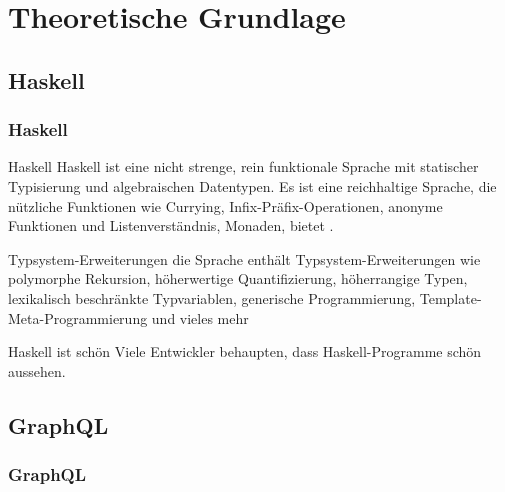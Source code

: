 
\section{Theoretische Grundlage}

\subsection{Haskell}
\begin{frame}{}
    \frametitle{Haskell}
\end{frame}

\begin{frame}{}

    \footnotesize

    \begin{block}{Haskell}
        Haskell ist eine nicht strenge, rein funktionale Sprache mit statischer Typisierung und algebraischen Datentypen. Es ist eine reichhaltige Sprache, die nützliche Funktionen wie Currying, Infix-Präfix-Operationen, anonyme Funktionen und Listenverständnis, Monaden, bietet \cite{history-of-haskell}.

    \end{block}

    \begin{block}{Typsystem-Erweiterungen}
    die Sprache enthält Typsystem-Erweiterungen wie polymorphe Rekursion, höherwertige Quantifizierung, höherrangige Typen, lexikalisch beschränkte Typvariablen, generische Programmierung, Template-Meta-Programmierung und vieles mehr \cite{history-of-haskell} 
    \end{block}

    \begin{alertblock}{Haskell ist schön}
        Viele Entwickler behaupten, dass Haskell-Programme schön aussehen. 
        \cite{history-of-haskell} 
    \end{alertblock}

\end{frame}


\subsection{GraphQL}
\begin{frame}{}
    \frametitle{GraphQL}
\end{frame}


